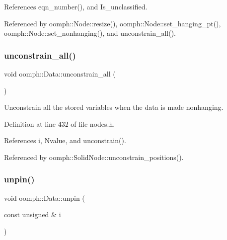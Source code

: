 References eqn\+\_\+number(), and Is\+\_\+unclassified.



Referenced by oomph\+::\+Node\+::resize(), oomph\+::\+Node\+::set\+\_\+hanging\+\_\+pt(), oomph\+::\+Node\+::set\+\_\+nonhanging(), and unconstrain\+\_\+all().

\mbox{\label{classoomph_1_1Data_a5e6a0d030f5e3230908f8a5eaf607082}} 
\subsubsection{\texorpdfstring{unconstrain\+\_\+all()}{unconstrain\_all()}}
{\footnotesize\ttfamily void oomph\+::\+Data\+::unconstrain\+\_\+all (\begin{DoxyParamCaption}{ }\end{DoxyParamCaption})\hspace{0.3cm}{\ttfamily [inline]}}



Unconstrain all the stored variables when the data is made nonhanging. 



Definition at line 432 of file nodes.\+h.



References i, Nvalue, and unconstrain().



Referenced by oomph\+::\+Solid\+Node\+::unconstrain\+\_\+positions().

\mbox{\label{classoomph_1_1Data_a4e5cb031bf8eceb8f97c2c4fbd74cb05}} 
\subsubsection{\texorpdfstring{unpin()}{unpin()}}
{\footnotesize\ttfamily void oomph\+::\+Data\+::unpin (\begin{DoxyParamCaption}\item[{const unsigned \&}]{i }\end{DoxyParamCaption})\hspace{0.3cm}{\ttfamily [inline]}}



